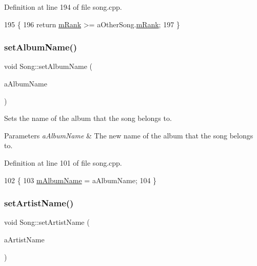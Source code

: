 Definition at line 194 of file song.\+cpp.


\begin{DoxyCode}
195 \{
196     \textcolor{keywordflow}{return} \mbox{\hyperlink{class_song_a18b47d2545fc5e7795cad143092c97e7}{mRank}} >= aOtherSong.\mbox{\hyperlink{class_song_a18b47d2545fc5e7795cad143092c97e7}{mRank}};
197 \}
\end{DoxyCode}
\mbox{\label{class_song_ac9c21b02ebe7a5801c2f36f255b38e49}} 
\subsubsection{\texorpdfstring{set\+Album\+Name()}{setAlbumName()}}
{\footnotesize\ttfamily void Song\+::set\+Album\+Name (\begin{DoxyParamCaption}\item[{Q\+String}]{a\+Album\+Name }\end{DoxyParamCaption})}



Sets the name of the album that the song belongs to. 


\begin{DoxyParams}{Parameters}
{\em a\+Album\+Name} & The new name of the album that the song belongs to. \\
\hline
\end{DoxyParams}


Definition at line 101 of file song.\+cpp.


\begin{DoxyCode}
102 \{
103     \mbox{\hyperlink{class_song_aadf3ea14887a9c5a36a1fe419d7d6222}{mAlbumName}} = aAlbumName;
104 \}
\end{DoxyCode}
\mbox{\label{class_song_ab071f31965057c073c4e25a846810f8d}} 
\subsubsection{\texorpdfstring{set\+Artist\+Name()}{setArtistName()}}
{\footnotesize\ttfamily void Song\+::set\+Artist\+Name (\begin{DoxyParamCaption}\item[{Q\+String}]{a\+Artist\+Name }\end{DoxyParamCaption})}



